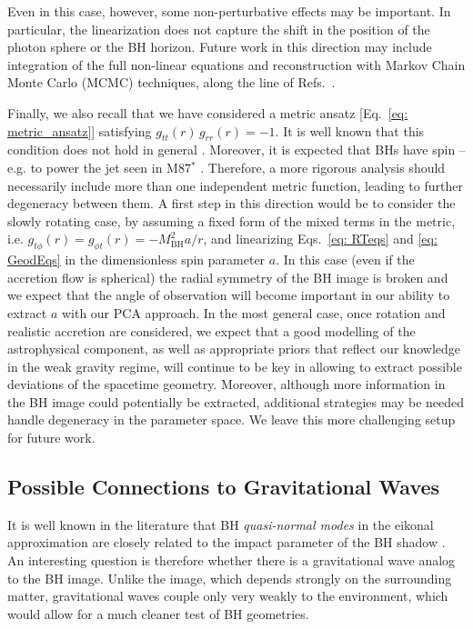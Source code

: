 \documentclass[%
nofootinbib,
 amsmath,amssymb,
 aps,
floatfix,
twocolumn
]{revtex4-2}
\begin{document}
Even in this case, however, some non-perturbative effects  may be important. In particular, the linearization does not capture the shift in the position of the photon sphere or the BH horizon. Future work in this direction may include integration of the full non-linear equations and reconstruction with Markov Chain Monte Carlo (MCMC) techniques, along the line of Refs.~\cite{Broderick_2014, THEMIS:2020eky}. 

Finally, we also recall that we have considered a metric ansatz [Eq.~\eqref{eq: metric_ansatz}] satisfying \(g_{tt}(r)\,g_{rr}(r) = -1 \). It is well known that this condition does not hold in general \cite{Jacobson_2007}. Moreover, it is expected that BHs have spin -- e.g. to power the jet seen in M87\(^{*}\) \cite{Akiyama:2019fyp, Jeter:2020lkw}. 
Therefore, a more rigorous analysis should necessarily include more than one independent metric function, leading to further degeneracy between them. 
A first step in this direction would be to consider the slowly rotating case, by assuming a fixed form of the mixed terms in the metric, i.e. \(g_{t\phi} (r) = g_{\phi t} (r) = - M_\text{BH}^2 a / r \), and linearizing Eqs.~\eqref{eq: RTeqs} and \eqref{eq: GeodEqs} in the dimensionless spin parameter \(a\). In this case (even if the accretion flow is spherical) the radial symmetry of the BH image is broken and we expect that the angle of observation will become important in our ability to extract \(a\) with our PCA approach.
In the most general case, once rotation and realistic accretion are considered, we expect that a good modelling of the astrophysical component, as well as appropriate priors that reflect our knowledge in the weak gravity regime, will continue to be key in allowing to extract possible deviations of the spacetime geometry. Moreover, although more information in the BH image could potentially be extracted, additional strategies may be needed handle degeneracy in the parameter space. We leave this more challenging setup for future work.

\subsection{Possible Connections to Gravitational Waves}\label{discussion_gw}

It is well known in the literature that BH \textit{quasi-normal modes} in the eikonal approximation are closely related to the impact parameter of the BH shadow \cite{PhysRevD.30.295,Yang:2012he}. An interesting question is therefore whether  there is a gravitational wave analog to the BH image. 
Unlike the image, which depends strongly on the surrounding matter, gravitational waves couple only very weakly to the environment, which would allow for a much cleaner test of BH geometries.
\end{document}
